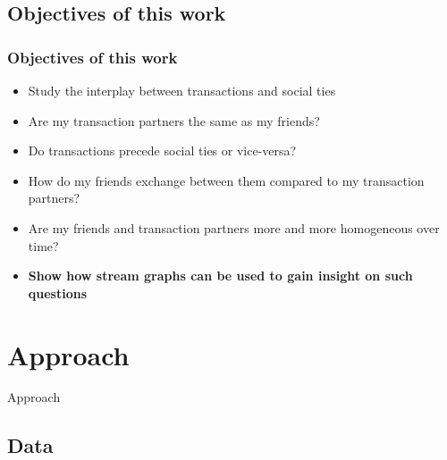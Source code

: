 \documentclass{beamer}
\begin{document}
\begin{frame}
\begin{columns}[c]
{\begin{figure}
				\end{figure}}
		\end{columns}
\end{frame}


\subsection{Objectives of this work}

\begin{frame}
	\frametitle{Objectives of this work}
	\begin{itemize}
		\item<1-> Study the interplay between transactions and social ties
		\item<2-> Are my transaction partners the same
as my friends?
		\item<3-> Do transactions precede social ties or vice-versa?
		\item<4-> How do my friends exchange between them compared to my transaction partners?
		\item<5-> Are my friends and transaction partners more and more homogeneous over time?
		\item<6-> \textbf{Show how stream graphs can be used to gain insight on such questions}	 
	\end{itemize}
\end{frame}



\section{Approach}

\begin{frame}
	\Huge{\centerline{Approach}}
\end{frame}

\subsection{Data}
\end{document}
